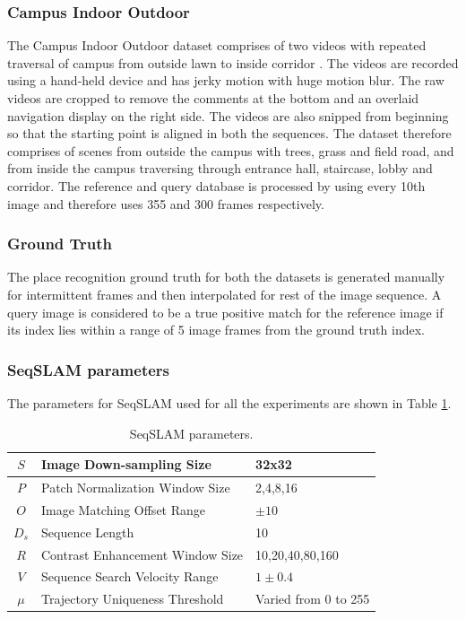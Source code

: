 \documentclass[letterpaper, 10 pt, conference]{ieeeconf}  %
\begin{document}
\subsubsection{Campus Indoor Outdoor}
The Campus Indoor Outdoor dataset comprises of two videos with repeated traversal of campus from outside lawn to inside corridor \cite{indoorOutdoor1,indoorOutdoor2}. The videos are recorded using a hand-held device and has jerky motion with huge motion blur. The raw videos are cropped to remove the comments at the bottom and an overlaid navigation display on the right side. The videos are also snipped from beginning so that the starting point is aligned in both the sequences. The dataset therefore comprises of scenes from outside the campus with trees, grass and field road, and from inside the campus traversing through entrance hall, staircase, lobby and corridor. The reference and query database is processed by using every 10th image and therefore uses 355 and 300 frames respectively.

\subsubsection{Ground Truth}
The place recognition ground truth for both the datasets is generated manually for intermittent frames and then interpolated for rest of the image sequence. A query image is considered to be a true positive match for the reference image if its index lies within a range of 5 image frames from the ground truth index.

\subsubsection{SeqSLAM parameters}
The parameters for SeqSLAM used for all the experiments are shown in Table \ref{table:seqSLAMParams}.

\begin{table}[!htbp]
\caption{SeqSLAM parameters.}
 \begin{tabular}{|c|p{4cm}|p{2.5cm}|}
 \hline
  $S$ & Image Down-sampling Size & 32x32 \\
  \hline
  $P$ & Patch Normalization Window Size & {2,4,8,16} \\
  \hline
  $O$ & Image Matching Offset Range & $\pm10$ \\
  \hline
  $D_s$ & Sequence Length & 10 \\
  \hline
  $R$ & Contrast Enhancement Window Size & {10,20,40,80,160} \\
  \hline
  $V$ & Sequence Search Velocity Range & $1\pm0.4$ \\
  \hline
  $\mu$ & Trajectory Uniqueness Threshold & Varied from 0 to 255 \\
 \hline
 \end{tabular}
\label{table:seqSLAMParams}
\end{table}
\end{document}
